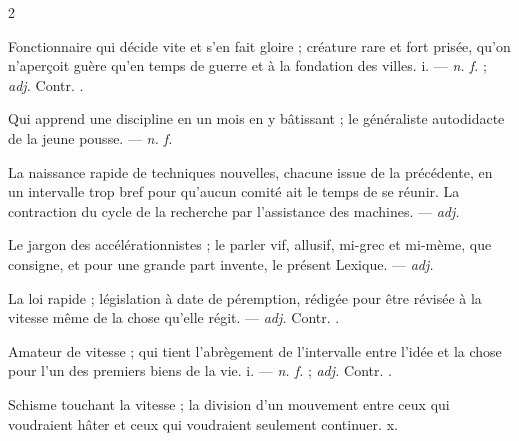 \begin{multicols}{2}

 Fonctionnaire qui décide vite et s'en fait gloire ; créature rare et fort prisée, qu'on n'aperçoit guère qu'en temps de guerre et à la fondation des villes.   i. —  \textit{n. f.} ;  \textit{adj.} Contr. .

 Qui apprend une discipline en un mois en y bâtissant ; le généraliste autodidacte de la jeune pousse. —  \textit{n. f.}

  La naissance rapide de techniques nouvelles, chacune issue de la précédente, en un intervalle trop bref pour qu'aucun comité ait le temps de se réunir.   La contraction du cycle de la recherche par l'assistance des machines. —  \textit{adj.}

 Le jargon des accélérationnistes ; le parler vif, allusif, mi-grec et mi-mème, que consigne, et pour une grande part invente, le présent Lexique. —  \textit{adj.}

 La loi rapide ; législation à date de péremption, rédigée pour être révisée à la vitesse même de la chose qu'elle régit. —  \textit{adj.} Contr. .

 Amateur de vitesse ; qui tient l'abrègement de l'intervalle entre l'idée et la chose pour l'un des premiers biens de la vie.   i. —  \textit{n. f.} ;  \textit{adj.} Contr. .

 Schisme touchant la vitesse ; la division d'un mouvement entre ceux qui voudraient hâter et ceux qui voudraient seulement continuer.   x.


\end{multicols}

